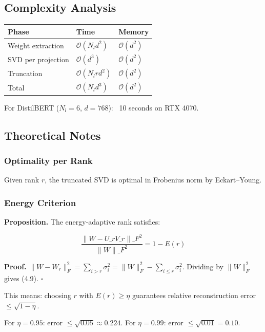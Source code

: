 \subsection{Complexity Analysis}

\begin{table}[H]
\centering
\small
\begin{tabular}{lll}
\toprule
\textbf{Phase} & \textbf{Time} & \textbf{Memory} \\
\midrule
Weight extraction & $\mathcal{O}(N_l d^2)$ & $\mathcal{O}(d^2)$ \\
SVD per projection & $\mathcal{O}(d^3)$ & $\mathcal{O}(d^2)$ \\
Truncation & $\mathcal{O}(N_l r d^2)$ & $\mathcal{O}(d^2)$ \\
Total & $\mathcal{O}(N_l d^3)$ & $\mathcal{O}(d^2)$ \\
\bottomrule
\end{tabular}
\end{table}

For DistilBERT ($N_l = 6$, $d = 768$): ~10 seconds on RTX 4070.

\subsection{Theoretical Notes}

\subsubsection{Optimality per Rank}

Given rank $r$, the truncated SVD is optimal in Frobenius norm by Eckart--Young.

\subsubsection{Energy Criterion}

\textbf{Proposition.} The energy-adaptive rank satisfies:

\[
\frac{\|W - U\_r V\_r\|\_F^2}{\|W\|\_F^2} = 1 - E(r)
\tag{4.9}
\]

\textbf{Proof.} $\|W - W_r\|_F^2 = \sum_{i > r} \sigma_i^2 = \|W\|_F^2 - \sum_{i \leq r} \sigma_i^2$. 
Dividing by $\|W\|_F^2$ gives (4.9). $\square$

This means: choosing $r$ with $E(r) \geq \eta$ guarantees relative 
reconstruction error $\leq \sqrt{1 - \eta}$.

For $\eta = 0.95$: error $\leq \sqrt{0.05} \approx 0.224$.
For $\eta = 0.99$: error $\leq \sqrt{0.01} = 0.10$.

